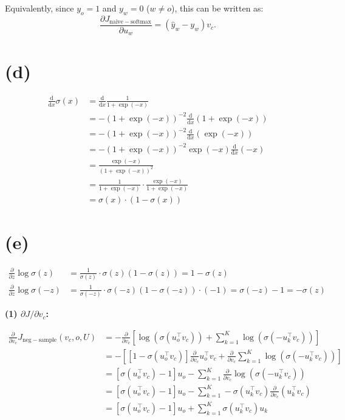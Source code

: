 \documentclass[12pt]{article}
\newcommand{\dd}{\mathrm{d}}
\begin{document}
\noindent Equivalently, since $ y_{o} = 1 $ and $ y_{w} = 0$ ($w \neq o$),
this can be written as: 
\[
    \frac{\partial J_{\mathrm{naive-softmax}}}{\partial u_w} = (\hat{y}_w - y_{w}) v_c.
\] 
 


\section*{(d)}

\begin{align*}
    \frac{\dd}{\dd x} \sigma(x) 
    &= \frac{\dd}{\dd x} \frac{1}{1 + \exp(-x)} \\
    &= - (1 + \exp(-x))^{-2} \frac{\dd}{\dd x} (1 + \exp(-x)) \\
    &= - (1 + \exp(-x))^{-2} \frac{\dd}{\dd x} (\exp(-x))\\
    &= - (1 + \exp(-x))^{-2} \exp(-x) \frac{\dd}{\dd x} (-x) \\
    &= \frac{\exp(-x) }{(1 + \exp(-x))^{2}} \\
    &= \frac{1}{1 + \exp(-x)} \cdot \frac{\exp(-x)}{1 + \exp(-x)} \\
      &= \sigma(x) \cdot (1 - \sigma(x))
\end{align*}

\section*{(e)}

\begin{align*}
      \frac{\partial}{\partial z} \log \sigma(z)
      &= \frac{1}{\sigma(z)} \cdot \sigma(z)(1 - \sigma(z)) = 1 - \sigma(z) \\
      \frac{\partial}{\partial z} \log \sigma(-z)
      &= \frac{1}{\sigma(-z)} \cdot \sigma(-z)(1 - \sigma(-z)) \cdot (-1) =\sigma(-z) - 1=  -\sigma(z)
\end{align*}

\textbf{(1) $\partial J / \partial v_c$:}

\begin{align*}
    \frac{\partial}{\partial v_c} J_{\mathrm{neg-sample}}(v_{c}, o, U) 
    &= - \frac{\partial}{\partial v_c}  \left[\log(\sigma(u_{o}^{\top}v_{c})) + \sum_{k=1}^{K}\log(\sigma(-u_{k}^{\top}v_{c}))\right] \\
    &=  - \left[  [1 - \sigma(u_{o}^{\top}v_{c}) ] \frac{\partial}{\partial v_c} u_{o}^{\top}v_{c}  +  \frac{\partial}{\partial v_c} \sum_{k=1}^{K}\log(\sigma(-u_{k}^{\top}v_{c}))\right] \\
    &=  [ \sigma(u_{o}^{\top}v_{c}) - 1 ] u_{o} - \sum_{k=1}^{K}  \frac{\partial}{\partial v_c} \log(\sigma(-u_{k}^{\top}v_{c})) \\
    &= [ \sigma(u_{o}^{\top}v_{c}) - 1 ] u_{o} - \sum_{k=1}^{K} -\sigma(u_{k}^{\top}v_{c}) \frac{\partial}{\partial v_c}( u_{k}^{\top}v_{c}) \\
    &= [ \sigma(u_{o}^{\top}v_{c}) - 1 ] u_{o} + \sum_{k=1}^{K} \sigma(u_{k}^{\top}v_{c})  u_{k}
\end{align*}
\end{document}
